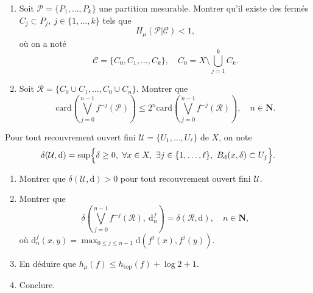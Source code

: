 \documentclass[a4paper,10pt,openany]{article}
\theoremstyle{plain}
\theoremstyle{definition}
\newcommand{\dd}{\mathrm{d}}
\newcommand{\N}{\mathbf{N}}
\begin{document}
\begin{enumerate}
\item Soit $\mathcal{P} = \{P_1, \dots, P_k\}$ une partition mesurable. Montrer qu'il existe des ferm\'es $C_j \subset P_j,~j \in \{1,\dots,k\}$ tels que
$$
H_\mu(\mathcal{P}| \mathcal{C}) < 1,
$$
o\`u on a not\'e
$$
\mathcal{C} = \{C_0, C_1, \dots, C_k\}, \quad C_0 = X \setminus \bigcup_{j=1}^k C_k.
$$
\item Soit $\mathcal{R} = \{C_0 \cup C_1, \dots, C_0 \cup C_n\}$. Montrer que 
$$
\mathrm{card}\left( \bigvee_{j=0}^{n-1} f^{-j}(\mathcal{P})\right) \leq 2^n \mathrm{card}\left(\bigvee_{j=0}^{n-1} f^{-j}(\mathcal{R})\right), \quad n \in \N.
$$
\end{enumerate}
Pour tout recouvrement ouvert fini $\mathcal{U} = \{U_1, \dots, U_\ell\}$ de $X$, on note
$$
\delta(\mathcal{U}, \dd) = \sup \Bigl\{ \delta \geq 0,~\forall x \in X,~\exists j \in \{1, \dots, \ell\},~B_\dd(x, \delta) \subset U_j \Bigr\}. 
$$
\begin{enumerate}[resume]
\item Montrer que $\delta(\mathcal{U}, \dd) > 0$ pour tout recouvrement ouvert fini $\mathcal{U}$.
\item Montrer que
$$
\delta\left(\bigvee_{j=0}^{n-1} f^{-j}(\mathcal{R}),~ \dd_n^f\right) = \delta(\mathcal{R}, \dd), \quad n \in \N,
$$
o\`u $\dd_n^f(x,y) = \max_{0 \leq j \leq n-1} \dd(f^j(x), f^j(y))$.
\item En d\'eduire que $h_\mu(f) \leq h_\mathrm{top}(f) + \log 2 + 1$.
\item Conclure.
\end{enumerate}
\end{document}
